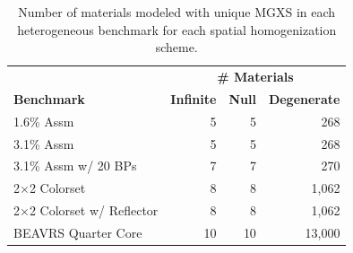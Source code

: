 \vspace{0.2in}

\begin{table}[h!]
  \centering
  \caption[Number of materials for each spatial homogenization scheme]{Number of materials modeled with unique \ac{MGXS} in each heterogeneous benchmark for each spatial homogenization scheme.}
  \small
  \label{table:chap8-num-materials}
  \vspace{6pt}
  \begin{tabular}{l r r r}
  \toprule
  \rowcolor{lightgray}
  & \multicolumn{3}{c}{\cellcolor{lightgray} \bf \# Materials} \\
  \multirow{-2}{*}{\cellcolor{lightgray} \bf Benchmark} &
  \multicolumn{1}{c}{\cellcolor{lightgray} \bf Infinite} &
  \multicolumn{1}{c}{\cellcolor{lightgray} \bf Null} &
  \multicolumn{1}{c}{\cellcolor{lightgray} \bf Degenerate} \\
  \midrule
1.6\% Assm & 5 & 5 & 268 \\
  \midrule
3.1\% Assm & 5 & 5 & 268 \\
  \midrule
3.1\% Assm w/ 20 BPs & 7 & 7 & 270  \\
  \midrule
2$\times$2 Colorset & 8 & 8 & 1,062 \\
  \midrule
2$\times$2 Colorset w/ Reflector & 8 & 8 & 1,062 \\
  \midrule
\ac{BEAVRS} Quarter Core & 10 & 10 & 13,000 \\ %
  \bottomrule
\end{tabular}
\end{table}

